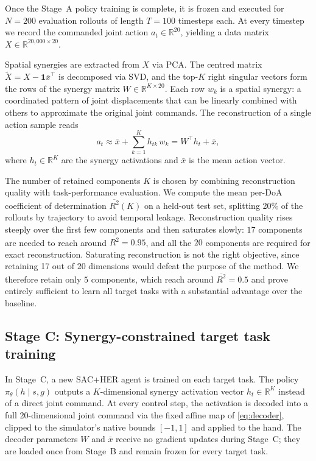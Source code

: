 \documentclass[letterpaper, 10 pt, conference]{ieeeconf}  %
\begin{document}
Once the Stage~A policy training is complete, it is frozen and executed for 
$N = 200$ evaluation rollouts of length $T = 100$ timesteps each. At 
every timestep we record the commanded joint action 
$a_t \in \mathbb{R}^{20}$, yielding a data matrix 
$X \in \mathbb{R}^{20{,}000 \times 20}$.

Spatial synergies are extracted from $X$ via PCA. The centred matrix 
$\tilde{X} = X - \mathbf{1}\bar{x}^\top$ is decomposed via SVD, and 
the top-$K$ right singular vectors form the rows of the synergy matrix 
$W \in \mathbb{R}^{K \times 20}$. Each row $w_k$ is a spatial synergy: 
a coordinated pattern of joint displacements that can be linearly 
combined with others to approximate the original joint commands. The 
reconstruction of a single action sample reads
%
\begin{equation}
    a_t \approx \bar{x} + \sum_{k=1}^{K} h_{tk}\, w_k = W^\top h_t + \bar{x},
    \label{eq:decoder}
\end{equation}
%
where $h_t \in \mathbb{R}^K$ are the synergy activations and $\bar{x}$ 
is the mean action vector.

The number of retained components $K$ is chosen by combining reconstruction quality with task-performance evaluation. We compute the mean per-DoA coefficient of determination $\overline{R^2}(K)$ on a held-out test set, splitting 20\% of the rollouts by trajectory to avoid temporal leakage. Reconstruction quality rises steeply over the first few components and then saturates slowly: $17$ components are needed to reach around $\overline{R^2} = 0.95 $, and all the $20$ components are required for exact reconstruction. Saturating reconstruction is not the right objective, since retaining 17 out of $20$ dimensions would defeat the purpose of the method. We therefore retain only $5$ components, which reach around $\overline{R^2} = 0.5 $ and prove entirely sufficient to learn all target tasks with a substantial advantage over the baseline.


\subsection{Stage C: Synergy-constrained target task training}

In Stage~C, a new SAC+HER agent is trained on each target task. The 
policy $\pi_\theta(h \mid s, g)$ outputs a $K$-dimensional synergy 
activation vector $h_t \in \mathbb{R}^K$ instead of a direct joint 
command. At every control step, the activation is decoded into a full 
20-dimensional joint command via the fixed affine map of 
\eqref{eq:decoder}, clipped to the simulator's native bounds $[-1, 1]$ 
and applied to the hand. The decoder parameters $W$ and $\bar{x}$ 
receive no gradient updates during Stage~C; they are loaded once from 
Stage~B and remain frozen for every target task.
\end{document}

